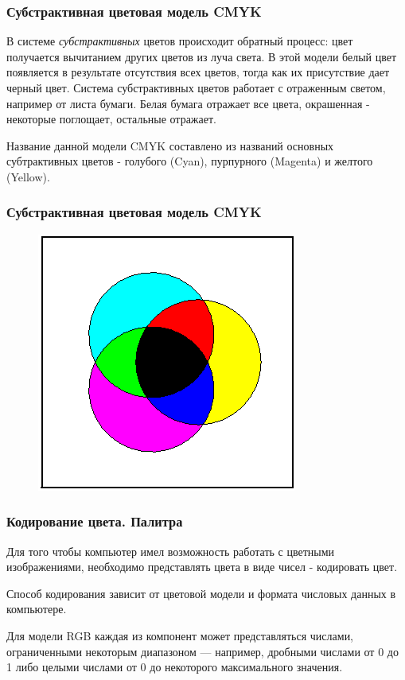 \begin{frame}
\frametitle{Субстрактивная цветовая модель CMYK}

В системе \textit{субстрактивных} цветов происходит обратный процесс: цвет получается вычитанием других цветов из луча света. В этой модели белый цвет появляется в результате отсутствия всех цветов, тогда как их присутствие дает черный цвет. Система субстрактивных цветов работает с отраженным светом, например от листа бумаги. Белая бумага отражает все цвета, окрашенная - некоторые поглощает, остальные отражает.

Название данной модели CMYK составлено из названий основных субтрактивных цветов - голубого (Cyan), пурпурного (Magenta) и желтого (Yellow).
\end{frame}
\begin{frame}
\frametitle{Субстрактивная цветовая модель CMYK}

\begin{figure}[htbp] \begin{center}
\includegraphics{images/part16}
\end{center} \end{figure}
\end{frame}


\begin{frame}
\frametitle{Кодирование цвета. Палитра}

Для того чтобы компьютер имел возможность работать с цветными изображениями, необходимо представлять цвета в виде чисел - кодировать цвет. 

Способ кодирования зависит от цветовой модели и формата числовых данных в компьютере.

Для модели RGB каждая из компонент может представляться числами, ограниченными некоторым диапазоном --- например, дробными числами от 0 до 1 либо целыми числами от 0 до некоторого максимального значения. 

\end{frame}

